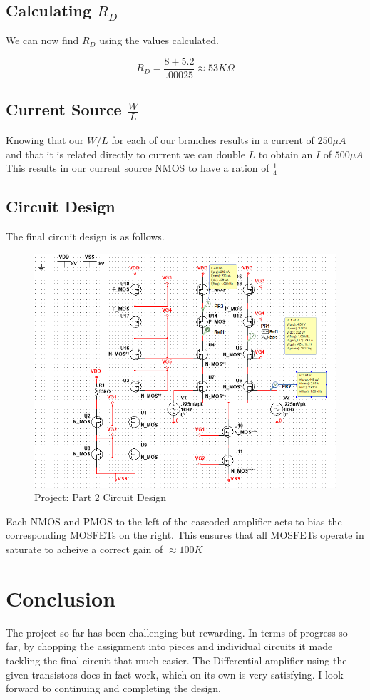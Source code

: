 \documentclass[12pt]{article}
\begin{document}
	\subsection{Calculating $R_D$}
	We can now find $R_D$ using the values calculated.
	
	$$R_D = \frac{8 + 5.2}{.00025} \approx 53K \Omega$$
	
	\subsection{Current Source $\frac{W}{L}$}
	Knowing that our $W/L$ for each of our branches results in a current of $250 \mu A$ and that it is related directly to current we can double $L$ to obtain an $I$ of $500\mu A$ This results in our current source NMOS to have a ration of $\frac{1}{4}$
	
	
	\subsection{Circuit Design}
	The final circuit design is as follows. 
		\begin{figure}[h!]
		\label{fig:amp}
		\caption{Project: Part 2 Circuit Design}
		\centering
		\includegraphics[width=1\textwidth]{fullcircuit}
	\end{figure}

	Each NMOS and PMOS to the left of the cascoded amplifier acts to bias the corresponding MOSFETs on the right. This ensures that all MOSFETs operate in saturate to acheive a correct gain of $\approx 100K$
	
	
	\section{Conclusion}
	The project so far has been challenging but rewarding. In terms of progress so far, by chopping the assignment into pieces and individual circuits it made tackling the final circuit that much easier. The Differential amplifier using the given transistors does in fact work, which on its own is very satisfying. I look forward to continuing and completing the design.
	
	
	
	
	
\end{document}
